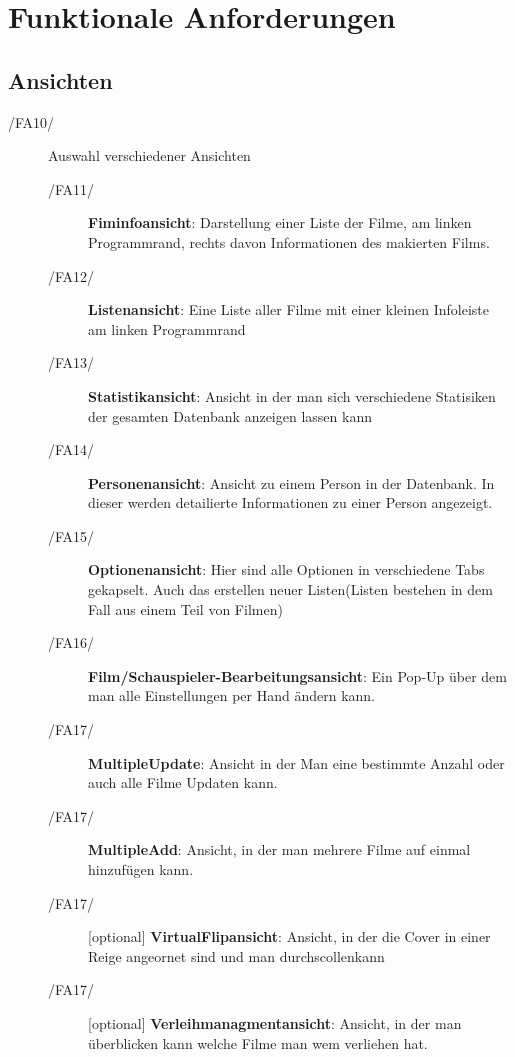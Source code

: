 \section{Funktionale Anforderungen}

\subsection{Ansichten}
\begin{description}
	\item[/FA10/] Auswahl verschiedener Ansichten
	\begin{description}
		\item[/FA11/] \textbf{Fiminfoansicht}: Darstellung einer Liste der Filme, am linken Programmrand, rechts davon Informationen des makierten Films.
		\item[/FA12/] \textbf{Listenansicht}: Eine Liste aller Filme mit einer kleinen Infoleiste am linken Programmrand
		\item[/FA13/] \textbf{Statistikansicht}: Ansicht in der man sich verschiedene Statisiken der gesamten Datenbank anzeigen lassen kann
		\item[/FA14/] \textbf{Personenansicht}: Ansicht zu einem Person in der Datenbank. In dieser werden detailierte Informationen zu einer Person angezeigt.
		\item[/FA15/] \textbf{Optionenansicht}: Hier sind alle Optionen in verschiedene Tabs gekapselt. Auch das erstellen neuer Listen(Listen bestehen in dem Fall aus einem Teil von Filmen)
		\item[/FA16/] \textbf{Film/Schauspieler-Bearbeitungsansicht}: Ein Pop-Up über dem man alle Einstellungen per Hand ändern kann.
		\item[/FA17/] \textbf{MultipleUpdate}: Ansicht in der Man eine bestimmte Anzahl oder auch alle Filme Updaten kann.
		\item[/FA17/]\textbf{MultipleAdd}: Ansicht, in der man mehrere Filme auf einmal hinzufügen kann.
		\item[/FA17/][optional] \textbf{VirtualFlipansicht}: Ansicht, in der die Cover in einer Reige angeornet sind und man durchscollenkann
		\item[/FA17/][optional] \textbf{Verleihmanagmentansicht}: Ansicht, in der man überblicken kann welche Filme man wem verliehen hat.
	\end{description}

\end{description}
